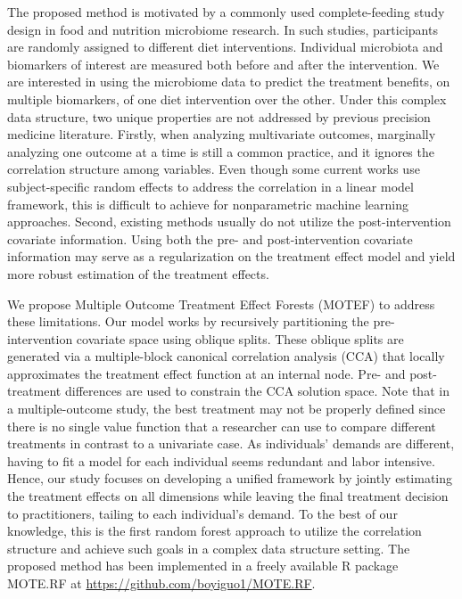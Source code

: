 \documentclass[smallextended]{svjour3}
\begin{document}
The proposed method is motivated by a commonly used complete-feeding study design in food and nutrition microbiome research. In such studies, participants are randomly assigned to different diet interventions. Individual microbiota and biomarkers of interest are measured both before and after the intervention. We are interested in using the microbiome data to predict the treatment benefits, on multiple biomarkers, of one diet intervention over the other. Under this complex data structure, two unique properties are not addressed by previous precision medicine literature. Firstly, when analyzing multivariate outcomes, marginally analyzing one outcome at a time is still a common practice, and it ignores the correlation structure among variables. Even though some current works use subject-specific random effects to address the correlation \citep{zhu2016individualizing} in a linear model framework, this is difficult to achieve for nonparametric machine learning approaches. Second, existing methods usually do not utilize the post-intervention covariate information. Using both the pre- and post-intervention covariate information may serve as a regularization on the treatment effect model and yield more robust estimation of the treatment effects. 

We propose Multiple Outcome Treatment Effect Forests (MOTEF) to address these limitations. Our model works by recursively partitioning the pre-intervention covariate space using oblique splits. These oblique splits are generated via a multiple-block canonical correlation analysis (CCA) that locally approximates the treatment effect function at an internal node. Pre- and post-treatment differences are used to constrain the CCA solution space. Note that in a multiple-outcome study, the best treatment may not be properly defined since there is no single value function \citep{qian2011performance} that a researcher can use to compare different treatments in contrast to a univariate case. As individuals' demands are different, having to fit a model for each individual seems redundant and labor intensive. Hence, our study focuses on developing a unified framework by jointly estimating the treatment effects on all dimensions while leaving the final treatment decision to practitioners, tailing to each individual's demand. To the best of our knowledge, this is the first random forest approach to utilize the correlation structure and achieve such goals in a complex data structure setting. The proposed method has been implemented in a freely available R package MOTE.RF at \url{https://github.com/boyiguo1/MOTE.RF}.
\end{document}
